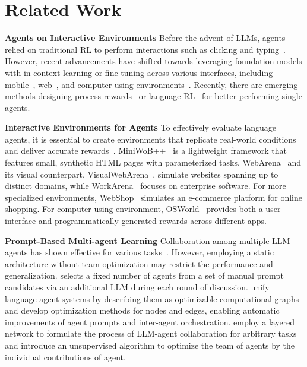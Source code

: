\section{Related Work}
\label{gen_inst}
\noindent\textbf{Agents on Interactive Environments} \quad Before the advent of LLMs, agents relied on traditional RL to perform interactions such as clicking and typing~\citep{liu2018learning,humphreys2022data}. However, recent advancements have shifted towards leveraging foundation models with in-context learning or fine-tuning across various interfaces, including mobile~\citep{wang2023enabling,hong2024cogagent}, web~\citep{lai2024autowebglm, deng-etal-2024-multi}, and computer using environments~\citep{xu2024crab, wu2024copilot}. Recently, there are emerging methods designing process rewards~\citep{he2024webvoyager, pan2024autonomous} or language RL~\citep{bai2024digirl} for better performing single agents. 

\noindent\textbf{Interactive Environments for Agents} \quad To effectively evaluate language agents, it is essential to create environments that replicate real-world conditions and deliver accurate rewards~\citep{rawles2024androidinthewild,deng2024mind2web}. MiniWoB++~\citep{shi2017world} is a lightweight framework that features small, synthetic HTML pages with parameterized tasks. WebArena~\citep{zhou2023webarena} and its visual counterpart, VisualWebArena~\citep{koh2024visualwebarena}, simulate websites spanning up to distinct domains, while WorkArena~\citep{drouin2024workarena} focuses on enterprise software. For more specialized environments, WebShop~\citep{yao2022webshop} simulates an e-commerce platform for online shopping. For computer using environment, OSWorld~\citep{xie2024osworld} provides both a user interface and programmatically generated rewards across different apps.

\noindent\textbf{Prompt-Based Multi-agent Learning} \quad Collaboration among multiple LLM agents has shown effective for various tasks~\citep{hong2024metagpt,wu2024autogen,qian-etal-2024-chatdev,wang2025mobileagenteselfevolvingmobileassistant}. However, employing a static architecture without team optimization may restrict the performance and generalization. \citet{chen2024agentverse} selects a fixed number of agents from a set of manual prompt candidates via an additional LLM during each round of discussion. %
\citet{zhuge2024gptswarm} unify language agent systems by describing them as optimizable computational graphs and develop optimization methods for nodes and edges, enabling automatic improvements of agent prompts and inter-agent orchestration. \citet{liu2024a} employ a layered network to formulate the process of LLM-agent collaboration for arbitrary tasks and introduce an unsupervised algorithm to optimize the team of agents by the individual contributions of agent.